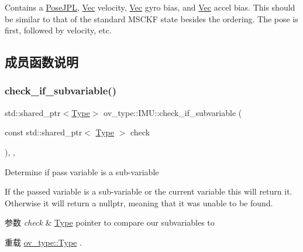 Contains a \hyperlink{classov__type_1_1PoseJPL}{Pose\+J\+PL}, \hyperlink{classov__type_1_1Vec}{Vec} velocity, \hyperlink{classov__type_1_1Vec}{Vec} gyro bias, and \hyperlink{classov__type_1_1Vec}{Vec} accel bias. This should be similar to that of the standard M\+S\+C\+KF state besides the ordering. The pose is first, followed by velocity, etc. 

\subsection{成员函数说明}
\mbox{\label{classov__type_1_1IMU_a3fb9631390473158abcdf97c71ea6e16}} 
\subsubsection{\texorpdfstring{check\+\_\+if\+\_\+subvariable()}{check\_if\_subvariable()}}
{\footnotesize\ttfamily std\+::shared\+\_\+ptr$<$\hyperlink{classov__type_1_1Type}{Type}$>$ ov\+\_\+type\+::\+I\+M\+U\+::check\+\_\+if\+\_\+subvariable (\begin{DoxyParamCaption}\item[{const std\+::shared\+\_\+ptr$<$ \hyperlink{classov__type_1_1Type}{Type} $>$}]{check }\end{DoxyParamCaption})\hspace{0.3cm}{\ttfamily [inline]}, {\ttfamily [override]}, {\ttfamily [virtual]}}



Determine if pass variable is a sub-\/variable 

If the passed variable is a sub-\/variable or the current variable this will return it. Otherwise it will return a nullptr, meaning that it was unable to be found.


\begin{DoxyParams}{参数}
{\em check} & \hyperlink{classov__type_1_1Type}{Type} pointer to compare our subvariables to \\
\hline
\end{DoxyParams}


重载 \hyperlink{classov__type_1_1Type_a95fcdbc584256baffc78935de5ab5da3}{ov\+\_\+type\+::\+Type} .

\mbox{\label{classov__type_1_1IMU_aadf4a83a2371984898ca8c6a339617ce}} 

